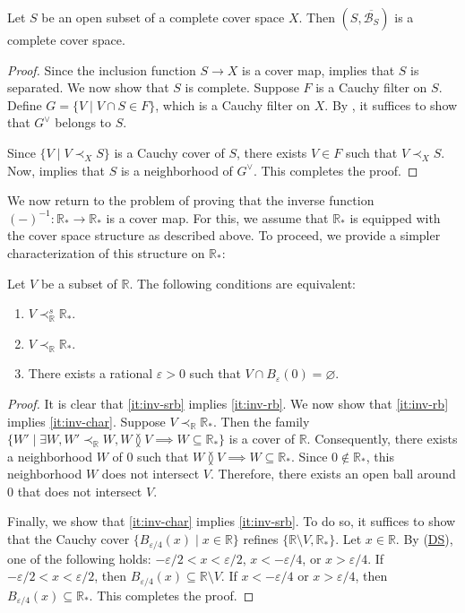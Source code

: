 \documentclass[reqno]{amsart}
\newcommand{\axref}[1]{(\hyperref[ax:#1]{#1})}
\theoremstyle{definition}
\theoremstyle{remark}
\numberwithin{figure}{section}
\newcommand{\overlap}[2]{#1 \between #2}
\newcommand{\rb}{\prec}
\begin{document}
\begin{prop}
Let $S$ be an open subset of a complete cover space $X$.
Then $(S,\overline{\mathcal{B}_S})$ is a complete cover space.
\end{prop}
\begin{proof}
Since the inclusion function $S \to X$ is a cover map,  implies that $S$ is separated.
We now show that $S$ is complete.
Suppose $F$ is a Cauchy filter on $S$.
Define $G = \{ V \mid V \cap S \in F \}$, which is a Cauchy filter on $X$.
By , it suffices to show that $G^\vee$ belongs to $S$.

Since $\{ V \mid V \rb_X S \}$ is a Cauchy cover of $S$, there exists $V \in F$ such that $V \rb_X S$.
Now,  implies that $S$ is a neighborhood of $G^\vee$.
This completes the proof.
\end{proof}

We now return to the problem of proving that the inverse function $(-)^{-1} : \mathbb{R}_* \to \mathbb{R}_*$ is a cover map.
For this, we assume that $\mathbb{R}_*$ is equipped with the cover space structure as described above.
To proceed, we provide a simpler characterization of this structure on $\mathbb{R}_*$:

\begin{lem}
Let $V$ be a subset of $\mathbb{R}$.
The following conditions are equivalent:
\begin{enumerate}
\item \label{it:inv-srb} $V \rb^s_\mathbb{R} \mathbb{R}_*$.
\item \label{it:inv-rb} $V \rb_\mathbb{R} \mathbb{R}_*$.
\item \label{it:inv-char} There exists a rational $\varepsilon > 0$ such that $V \cap B_\varepsilon(0) = \varnothing$.
\end{enumerate}
\end{lem}
\begin{proof}
It is clear that \eqref{it:inv-srb} implies \eqref{it:inv-rb}.
We now show that \eqref{it:inv-rb} implies \eqref{it:inv-char}. 
Suppose $V \rb_\mathbb{R} \mathbb{R}_*$.
Then the family $\{ W' \mid \exists W, W' \rb_\mathbb{R} W, \overlap{W}{V} \implies W \subseteq \mathbb{R}_* \}$ is a cover of $\mathbb{R}$.
Consequently, there exists a neighborhood $W$ of $0$ such that $\overlap{W}{V} \implies W \subseteq \mathbb{R}_*$.
Since $0 \notin \mathbb{R}_*$, this neighborhood $W$ does not intersect $V$.
Therefore, there exists an open ball around $0$ that does not intersect $V$.

Finally, we show that \eqref{it:inv-char} implies \eqref{it:inv-srb}.
To do so, it suffices to show that the Cauchy cover $\{ B_{\varepsilon/4}(x) \mid x \in \mathbb{R} \}$ refines $\{ \mathbb{R} \setminus V, \mathbb{R}_* \}$.
Let $x \in \mathbb{R}$.
By \axref{DS}, one of the following holds: $-\varepsilon/2 < x < \varepsilon/2$, $x < -\varepsilon/4$, or $x > \varepsilon/4$.
If $-\varepsilon/2 < x < \varepsilon/2$, then $B_{\varepsilon/4}(x) \subseteq \mathbb{R} \setminus V$.
If $x < -\varepsilon/4$ or $x > \varepsilon/4$, then $B_{\varepsilon/4}(x) \subseteq \mathbb{R}_*$.
This completes the proof.
\end{proof}
\end{document}
